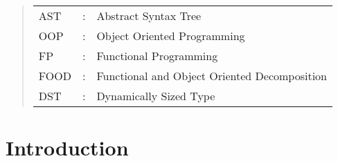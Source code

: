 \documentclass[ oneside,%
                    author={James Elgar},
                    degree={MEng},
                     title={Bidirectional transformer between functional and \\ object-oriented programming in Rust},
                  subtitle={}]{dissertation}
\begin{document}
\begin{quote}
\noindent
\begin{tabular}{lcl}
AST                 &:     & Abstract Syntax Tree                                        \\
OOP                 &:     & Object Oriented Programming                                 \\
FP                  &:     & Functional Programming                                      \\
FOOD                &:     & Functional and Object Oriented Decomposition                \\
DST                 &:     & Dynamically Sized Type                                      \\
\end{tabular}
\end{quote}



%

\mainmatter


\chapter{Introduction}
\label{chap:context}

\end{document}
